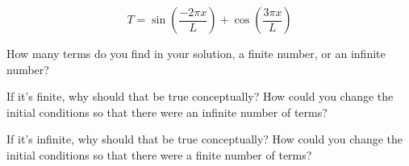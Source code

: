 \documentclass[12pt]{article}
\begin{document}
\begin{equation}
  T = \sin\left(\frac{-2\pi x}{L}\right) + \cos\left(\frac{3\pi x}{L}\right)
\end{equation}

How many terms do you find in your solution, a finite number, or an
infinite number? 

If it's finite, why should that be true conceptually? How could you
change the initial conditions so that there were an infinite number of terms?

If it's infinite, why should that be true conceptually? How could you
change the initial conditions so that there were a finite number of terms?
\end{document}
